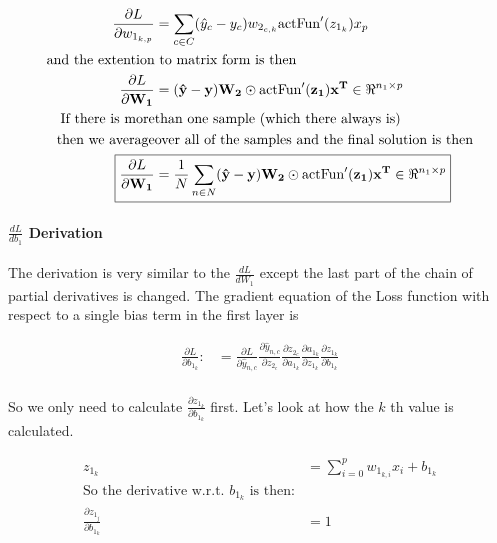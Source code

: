 \documentclass[]{article}
\begin{document}
\begin{align*}
\frac{\partial L}{\partial w_{1_{k,p}}} &= \sum_{c\in C}( \hat{y}_c - y_c) w_{2_{c,k}}\text{actFun}'(z_{1_k})x_p \\
\text{and the extention}&\text{ to matrix form is then} \\
\frac{\partial L}{\partial \mathbf{W_1}} &= (\mathbf{ \hat{y}} - \mathbf{y}) \mathbf{W_2}  \odot \text{actFun}'(\mathbf{z_1})\mathbf{x^T} \in \Re^{n_1 \times p} \\
\text{If there is more}&\text{than one sample (which there always is)}\\
\text{then we average}&\text{over all of the samples and the final solution is then} \\
\Aboxed{\frac{\partial L}{\partial \mathbf{W_1}} &=  \frac{1}{N} \sum_{n\in N} (\mathbf{ \hat{y}} - \mathbf{y}) \mathbf{W_2}  \odot \text{actFun}'(\mathbf{z_1})\mathbf{x^T} \in \Re^{n_1 \times p}} \\
\end{align*}

\paragraph{$\frac{dL}{db_1}$ Derivation}
The derivation is very similar to the $\frac{dL}{dW_1}$ except the last part of the chain of partial derivatives is changed. The gradient equation of the Loss function with respect to a single bias term in the first layer is 

\begin{align*}
\frac{\partial L}{\partial b_{1_{k}}} : &=  \frac{\partial L }{\partial  \hat{y}_{n,c} } \frac{\partial  \hat{y}_{n,c} }{\partial z_{2_c}} \frac{\partial z_{2_c}}{\partial a_{1_k}}\frac{\partial a_{1_k}}{\partial z_{1_k}} \frac{\partial z_{1_k}}{\partial b_{1_{k}}}  \\
\end{align*}

So we only need to calculate $\frac{\partial z_{1_k}} {\partial b_{1_{k}} }$ first. Let's look at how the $k$ th value is calculated. 

\begin{align*}
z_{1_k} &= \sum_{i = 0}^p w_{1_{k,i}}x_i + b_{1_k} \\
\text{So the derivative w.r.t. $b_{1_{k}}$ is then:}\\
\frac{\partial z_{1_j} }{\partial b_{1_{k}}} &= 1 \\
\end{align*}
\end{document}
